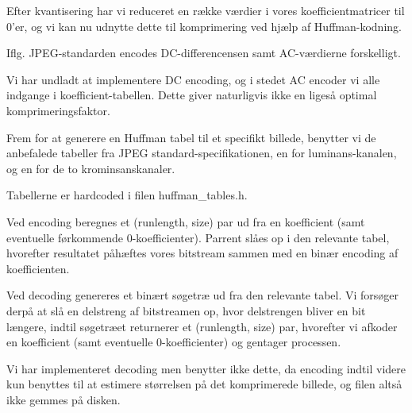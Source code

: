 Efter kvantisering har vi reduceret en række værdier i vores koefficientmatricer til 0'er, og vi kan nu udnytte dette til komprimering ved hjælp af Huffman-kodning.

Iflg. JPEG-standarden encodes DC-differencensen samt AC-værdierne forskelligt. 

Vi har undladt at implementere DC encoding, og i stedet AC encoder vi alle indgange i koefficient-tabellen. Dette giver naturligvis ikke en ligeså optimal komprimeringsfaktor.

Frem for at generere en Huffman tabel til et specifikt billede, benytter vi de anbefalede tabeller fra JPEG standard-specifikationen, en for luminans-kanalen, og en for de to krominsanskanaler.

Tabellerne er hardcoded i filen huffman_tables.h. 

Ved encoding beregnes et (runlength, size) par ud fra en koefficient (samt eventuelle førkommende 0-koefficienter). Parrent slåes op i den relevante tabel, hvorefter resultatet påhæftes vores bitstream sammen med en binær encoding af koefficienten.

Ved decoding genereres et binært søgetræ ud fra den relevante tabel. Vi forsøger derpå at slå en delstreng af bitstreamen op, hvor delstrengen bliver en bit længere, indtil søgetræet returnerer et (runlength, size) par, hvorefter vi afkoder en koefficient (samt eventuelle 0-koefficienter) og gentager processen.

Vi har implementeret decoding men benytter ikke dette, da encoding indtil videre kun benyttes til at estimere størrelsen på det komprimerede billede, og filen altså ikke gemmes på disken.

